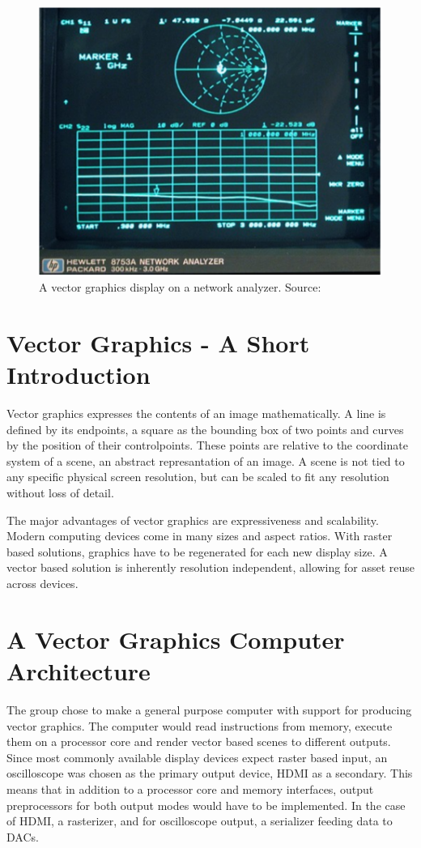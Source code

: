 \begin{figure}[h!]
    \centering
    \includegraphics[width=0.8\linewidth]{images/network-analyzer-vector-graphics-display.png}
    \caption{A vector graphics display on a network analyzer. Source: \cite{assignment-text}}
    \label{fig:vector-display-network-analyzer}
\end{figure}

\section{Vector Graphics - A Short Introduction}

Vector graphics expresses the contents of an image mathematically.
A line is defined by its endpoints, a square as the bounding box of two points and curves by the position of their controlpoints.
These points are relative to the coordinate system of a scene, an abstract represantation of an image.
A scene is not tied to any specific physical screen resolution, but can be scaled to fit any resolution without loss of detail.

The major advantages of vector graphics are expressiveness and scalability.
Modern computing devices come in many sizes and aspect ratios.
With raster based solutions, graphics have to be regenerated for each new display size.
A vector based solution is inherently resolution independent, allowing for asset reuse across devices.

\section{A Vector Graphics Computer Architecture}

The group chose to make a general purpose computer with support for producing vector graphics.
The computer would read instructions from memory, execute them on a processor core and render vector based scenes to different outputs.
Since most commonly available display devices expect raster based input, an oscilloscope was chosen as the primary output device, HDMI as a secondary.
This means that in addition to a processor core and memory interfaces, output preprocessors for both output modes would have to be implemented.
In the case of HDMI, a rasterizer, and for oscilloscope output, a serializer feeding data to DACs.

